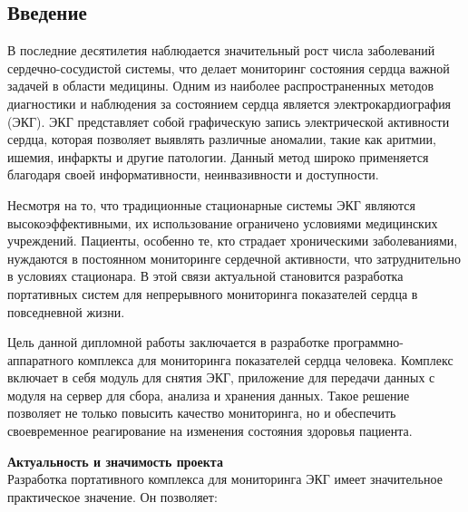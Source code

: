 \documentclass[12pt, russian]{extarticle}
\begin{document}

\begin{spacing}{1.5}

\tableofcontents
\thispagestyle{empty}
\newpage

\pagestyle{plain}
\setcounter{page}{3}

\section{Введение}

В последние десятилетия наблюдается значительный рост числа заболеваний сердечно-сосудистой системы, что делает мониторинг состояния сердца важной задачей в области медицины. Одним из наиболее распространенных методов диагностики и наблюдения за состоянием сердца является электрокардиография (ЭКГ). ЭКГ представляет собой графическую запись электрической активности сердца, которая позволяет выявлять различные аномалии, такие как аритмии, ишемия, инфаркты и другие патологии. Данный метод широко применяется благодаря своей информативности, неинвазивности и доступности.

Несмотря на то, что традиционные стационарные системы ЭКГ являются высокоэффективными, их использование ограничено условиями медицинских учреждений. Пациенты, особенно те, кто страдает хроническими заболеваниями, нуждаются в постоянном мониторинге сердечной активности, что затруднительно в условиях стационара. В этой связи актуальной становится разработка портативных систем для непрерывного мониторинга показателей сердца в повседневной жизни.

Цель данной дипломной работы заключается в разработке программно-аппаратного комплекса для мониторинга показателей сердца человека. Комплекс включает в себя модуль для снятия ЭКГ, приложение для передачи данных с модуля на сервер для сбора, анализа и хранения данных. Такое решение позволяет не только повысить качество мониторинга, но и обеспечить своевременное реагирование на изменения состояния здоровья пациента.

\noindent \textbf {Актуальность и значимость проекта \\}
Разработка портативного комплекса для мониторинга ЭКГ имеет значительное практическое значение. Он позволяет:


\end{spacing}
\end{document}
